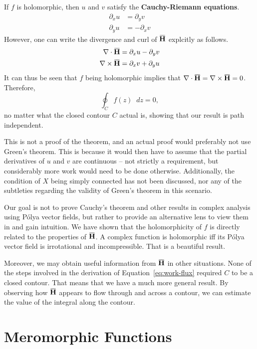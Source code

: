 \documentclass[a4paper]{article}
\newcommand*\diff{\mathop{}\!d} %
\newcommand{\overbar}[1]{\mkern 1.5mu\overline{\mkern-1.5mu#1\mkern-1.5mu}\mkern 1.5mu}
\theoremstyle{definition}
\begin{document}
If $f$ is holomorphic, then $u$ and $v$ satisfy the \textbf{Cauchy-Riemann equations}.
\begin{align*}
    \partial_x u & = \partial_y v  \\
    \partial_y u & = -\partial_x v
\end{align*}
However, one can write the divergence and curl of $\mathbf{\overbar{H}}$ explcitly as follows.
\begin{align*}
    \nabla \cdot \mathbf{\overbar{H}}  & = \partial_x u - \partial_y v \\
    \nabla \times \mathbf{\overbar{H}} & = \partial_x v + \partial_y u
\end{align*}
It can thus be seen that $f$ being holomorphic implies that $\nabla \cdot \mathbf{\overbar{H}} = \nabla \times \mathbf{\overbar{H}} = 0$.
Therefore,
\begin{equation}
    \oint_C f(z) \diff z = 0,
\end{equation}
no matter what the closed contour $C$ actual is, showing that our result is path independent.

This is not a proof of the theorem, and an actual proof would preferably not use Green's theorem.
This is because it would then have to assume that the partial derivatives of $u$ and $v$ are continuous -- not strictly a requirement, but considerably more work would need to be done otherwise.
Additionally, the condition of $X$ being simply connected has not been discussed, nor any of the subtleties regarding the validity of Green's theorem in this scenario.

Our goal is not to prove Cauchy's theorem and other results in complex analysis using P\'olya vector fields, but rather to provide an alternative lens to view them in and gain intuition.
We have shown that the holomorphicity of $f$ is directly related to the properties of $\mathbf{\overbar{H}}$.
A complex function is holomorphic iff its P\'olya vector field is irrotational and incompressible.
That is a beautiful result.

Moreover, we may obtain useful information from $\mathbf{\overbar{H}}$ in other situations.
None of the steps involved in the derivation of Equation~\eqref{eq:work-flux} required $C$ to be a closed contour.
That means that we have a much more general result.
By observing how $\mathbf{\overbar{H}}$ appears to flow through and across a contour, we can estimate the value of the integral along the contour.

\section{Meromorphic Functions}
\end{document}
